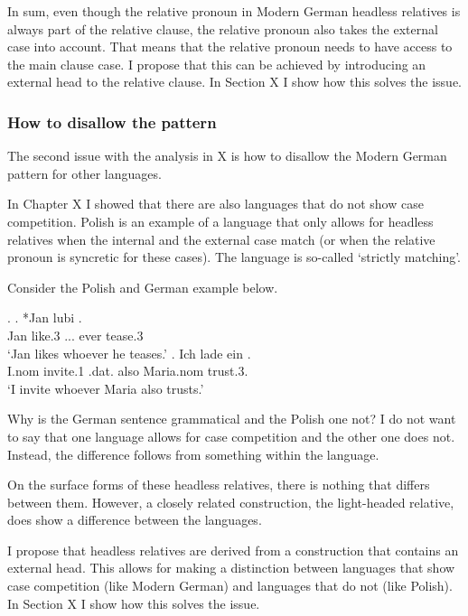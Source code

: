 In sum, even though the relative pronoun in Modern German headless relatives is always part of the relative clause, the relative pronoun also takes the external case into account. That means that the relative pronoun needs to have access to the main clause case. I propose that this can be achieved by introducing an external head to the relative clause. In Section X I show how this solves the issue.


\subsubsection{How to disallow the pattern}

The second issue with the analysis in X is how to disallow the Modern German pattern for other languages.

In Chapter X I showed that there are also languages that do not show case competition. Polish is an example of a language that only allows for headless relatives when the internal and the external case match (or when the relative pronoun is syncretic for these cases). The language is so-called `strictly matching'.

Consider the Polish and German example below.

\ex.
\ag. *Jan lubi   .\\
Jan like.3\scsub{[acc]} ... ever tease.3\scsub{[dat]}\\
`Jan likes whoever he teases.'\label{ex:polish-acc-dat}
\bg. Ich {lade ein}    . \\
 I.\ac{nom} invite.1\scsub{[acc]} .\ac{dat}. also Maria.\ac{nom} trust.3\scsub{[dat]}.\\
 `I invite whoever Maria also trusts.' \label{ex:mg-acc-dat-disallow}

Why is the German sentence grammatical and the Polish one not? I do not want to say that one language allows for case competition and the other one does not. Instead, the difference follows from something within the language.

On the surface forms of these headless relatives, there is nothing that differs between them. However, a closely related construction, the light-headed relative, does show a difference between the languages.

I propose that headless relatives are derived from a construction that contains an external head. This allows for making a distinction between languages that show case competition (like Modern German) and languages that do not (like Polish). In Section X I show how this solves the issue.



